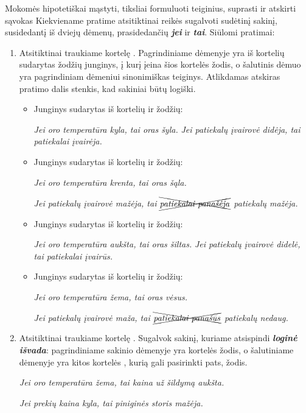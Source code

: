 \documentclass{article}
\begin{document}
\begin{mybox}{Mokomės hipotetiškai mąstyti$\text{,}$ tiksliai formuluoti teiginius$\text{,}$ suprasti ir atskirti sąvokas}
Kiekviename pratime atsitiktinai reikės sugalvoti sudėtinį sakinį, susidedantį iš dviejų dėmenų, prasidedančių \textbf{\textit{jei}} ir \textbf{\textit{tai}}. Siūlomi pratimai:

\begin{enumerate}
\item Atsitiktinai traukiame kortelę . Pagrindiniame dėmenyje yra iš kortelių sudarytas žodžių junginys, į kurį įeina šios kortelės žodis, o šalutinis dėmuo yra pagrindiniam dėmeniui sinonimiškas teiginys. Atlikdamas atskiras pratimo dalis stenkis, kad sakiniai būtų logiški. 

\begin{itemize}
\item Junginys sudarytas iš kortelių  ir  žodžių:

\textit{Jei oro temperatūra kyla, tai oras šyla.}
\textit{Jei patiekalų įvairovė didėja, tai patiekalai įvairėja.}
\item Junginys sudarytas iš kortelių  ir  žodžių:

\textit{Jei oro temperatūra krenta, tai oras šąla.}

\textit{Jei patiekalų įvairovė mažėja, tai $\bcancel{\cancel{\text{\textit{patiekalai panašėja}}}}$ patiekalų mažėja.}

\item Junginys sudarytas iš kortelių  ir  žodžių:

\textit{Jei oro temperatūra aukšta, tai oras šiltas.}
\textit{Jei patiekalų įvairovė didelė, tai patiekalai įvairūs.}
\item Junginys sudarytas iš kortelių  ir  žodžių:

\textit{Jei oro temperatūra žema, tai oras vėsus.}

\textit{Jei patiekalų įvairovė maža, tai $\bcancel{\cancel{\text{\textit{patiekalai panašūs}}}}$ patiekalų nedaug.}
\end{itemize}
\item Atsitiktinai traukiame kortelę . Sugalvok sakinį, kuriame atsispindi \textit{\textbf{loginė išvada}}: pagrindiniame sakinio dėmenyje yra kortelės  žodis, o šalutiniame dėmenyje yra kitos kortelės , kurią gali pasirinkti pats, žodis.

\textit{Jei oro temperatūra žema, tai kaina už šildymą aukšta.}

\textit{Jei prekių kaina kyla, tai piniginės storis mažėja.}
\end{enumerate}
\end{mybox}
\end{document}
